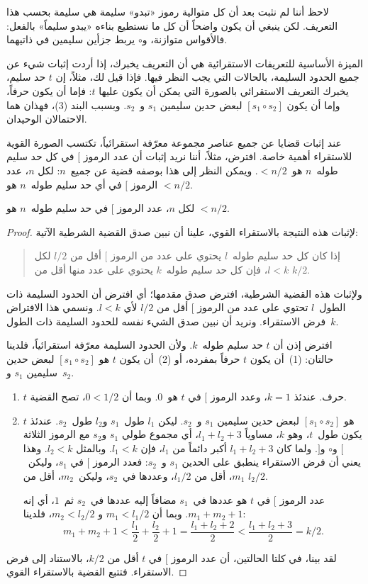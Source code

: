 \documentclass[../../../include/open-logic-section]{subfiles}
\begin{document}
لاحظ أننا لم نثبت بعد أن كل متوالية رموز «تبدو» سليمة هي سليمة بحسب
هذا التعريف. لكن ينبغي أن يكون واضحاً أن كل ما نستطيع بناءه «يبدو
سليماً» بالفعل: فالأقواس متوازنة، و$\circ$ يربط جزأين سليمين في
ذاتيهما.

الميزة الأساسية للتعريفات الاستقرائية هي أن التعريف يخبرك، إذا أردت
إثبات شيء عن جميع الحدود السليمة، بالحالات التي يجب النظر فيها. فإذا
قيل لك، مثلاً، إن $t$ حد سليم، يخبرك التعريف الاستقرائي بالصورة التي
يمكن أن يكون عليها $t$: فإما أن يكون حرفاً، وإما أن يكون
$[s_1 \circ s_2]$ لبعض حدين سليمين $s_1$ و~$s_2$. وبسبب البند (3)،
فهذان هما الاحتمالان الوحيدان.

عند إثبات قضايا عن جميع عناصر مجموعة معرّفة استقرائياً، تكتسب الصورة
القوية للاستقراء أهمية خاصة. افترض، مثلاً، أننا نريد إثبات أن عدد
الرموز $[$ في كل حد سليم طوله~$n$ هو~$< n/2$. ويمكن النظر إلى هذا
بوصفه قضية عن جميع~$n$: لكل $n$، عدد الرموز $[$ في أي حد سليم
طوله~$n$ هو $< n/2$.

\begin{prop}
  لكل $n$، عدد الرموز $[$ في حد سليم طوله~$n$ هو $< n/2$.
\end{prop}

\begin{proof}
لإثبات هذه النتيجة بالاستقراء القوي، علينا أن نبين صدق القضية الشرطية
الآتية:
\begin{quote}
  إذا كان كل حد سليم طوله~$l$ يحتوي على عدد من الرموز $[$ أقل من
  $l/2$ لكل $l < k$، فإن كل حد سليم طوله~$k$ يحتوي على عدد منها أقل
  من $k/2$.
\end{quote}
ولإثبات هذه القضية الشرطية، افترض صدق مقدمها؛ أي افترض أن الحدود السليمة
ذات الطول~$l$ تحتوي على عدد من الرموز $[$ أقل من $l/2$ لأي $l<k$.
ونسمي هذا الافتراض فرض الاستقراء. ونريد أن نبين صدق الشيء نفسه للحدود
السليمة ذات الطول~$k$.

افترض إذن أن $t$ حد سليم طوله~$k$. ولأن الحدود السليمة معرّفة
استقرائياً، فلدينا حالتان: (1)~أن يكون $t$ حرفاً بمفرده، أو (2)~أن يكون
$t$ هو $[s_1 \circ s_2]$ لبعض حدين سليمين $s_1$ و~$s_2$.
\begin{enumerate}
\item $t$ حرف. عندئذ $k = 1$، وعدد الرموز $[$ في $t$ هو~$0$.
وبما أن $0 < 1/2$، تصح القضية.
\item $t$ هو $[s_1 \circ s_2]$ لبعض حدين سليمين $s_1$ و~$s_2$.
  ليكن $l_1$ طول~$s_1$ و$l_2$ طول~$s_2$. عندئذ يكون طول~$t$، وهو
  $k$، مساوياً $l_1+l_2+3$، أي مجموع طولي $s_1$ و$s_2$ مع الرموز
  الثلاثة $[$ و$\circ$ و$]$. ولما كان $l_1+l_2+3$ أكبر دائماً من
  $l_1$، فإن $l_1 < k$. وبالمثل $l_2 < k$. وهذا يعني أن فرض
  الاستقراء ينطبق على الحدين $s_1$ و~$s_2$: فعدد الرموز $[$ في
  $s_1$، وليكن~$m_1$، أقل من $l_1/2$، وعددها في~$s_2$، وليكن~$m_2$،
  أقل من $l_2/2$.

  عدد الرموز $[$ في $t$ هو عددها في~$s_1$ مضافاً إليه عددها في~$s_2$
  ثم~$1$، أي إنه $m_1 + m_2 + 1$. وبما أن $m_1 < l_1/2$ و
  $m_2 < l_2/2$، فلدينا:
  \[
  m_1 + m_2 + 1 < \frac{l_1}{2} + \frac{l_2}{2} + 1 = \frac{l_1+l_2+2}{2} < \frac{l_1+l_2+3}{2} = k/2.
  \]
\end{enumerate}
لقد بينا، في كلتا الحالتين، أن عدد الرموز $[$ في $t$ أقل من $k/2$،
بالاستناد إلى فرض الاستقراء. فتتبع القضية بالاستقراء القوي.
\end{proof}
\end{document}
